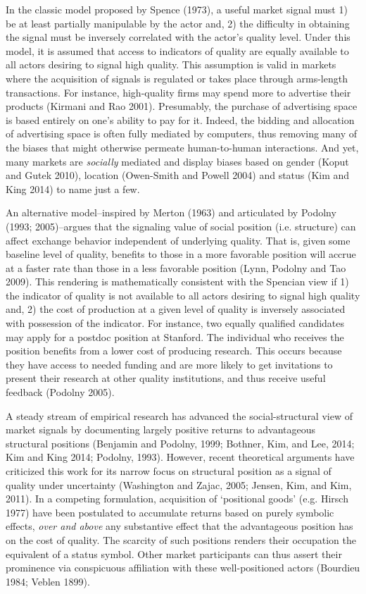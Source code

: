 In the classic model proposed by Spence (1973), a useful market signal must 1) be at least partially manipulable by the actor and, 2) the difficulty in obtaining the signal must be inversely correlated with the actor's quality level. Under this model, it is assumed that access to indicators of quality are equally available to all actors desiring to signal high quality. This assumption is valid in markets where the acquisition of signals is regulated or takes place through arms-length transactions. For instance, high-quality firms may spend more to advertise their products (Kirmani and Rao 2001). Presumably, the purchase of advertising space is based entirely on one's ability to pay for it. Indeed, the bidding and allocation of advertising space is often fully mediated by computers, thus removing many of the biases that might otherwise permeate human-to-human interactions. And yet, many markets are \emph{socially} mediated and display biases based on gender (Koput and Gutek 2010), location (Owen-Smith and Powell 2004) and status (Kim and King 2014) to name just a few. 

An alternative model--inspired by Merton (1963) and articulated by Podolny (1993; 2005)--argues that the signaling value of social position (i.e. structure) can affect exchange behavior independent of underlying quality. That is, given some baseline level of quality, benefits to those in a more favorable position will accrue at a faster rate than those in a less favorable position (Lynn, Podolny and Tao 2009). This rendering is mathematically consistent with the Spencian view if 1) the indicator of quality is not available to all actors desiring to signal high quality and, 2) the cost of production at a given level of quality is inversely associated with possession of the indicator. For instance, two equally qualified candidates may apply for a postdoc position at Stanford. The individual who receives the position benefits from a lower cost of producing research. This occurs because they have access to needed funding and are more likely to get invitations to present their research at other quality institutions, and thus receive useful feedback (Podolny 2005).

A steady stream of empirical research has advanced the social-structural view of market signals by documenting largely positive returns to advantageous structural positions (Benjamin and Podolny, 1999; Bothner, Kim, and Lee, 2014; Kim and King 2014; Podolny, 1993). However, recent theoretical arguments have criticized this work for its narrow focus on structural position as a signal of quality under uncertainty (Washington and Zajac, 2005; Jensen, Kim, and Kim, 2011). In a competing formulation, acquisition of `positional goods' (e.g. Hirsch 1977) have been postulated to accumulate returns based on purely symbolic effects, {\it over and above} any substantive effect that the advantageous position has on the cost of quality. The scarcity of such positions renders their occupation the equivalent of a status symbol. Other market participants can thus assert their prominence via conspicuous affiliation with these well-positioned actors (Bourdieu 1984; Veblen 1899). 

